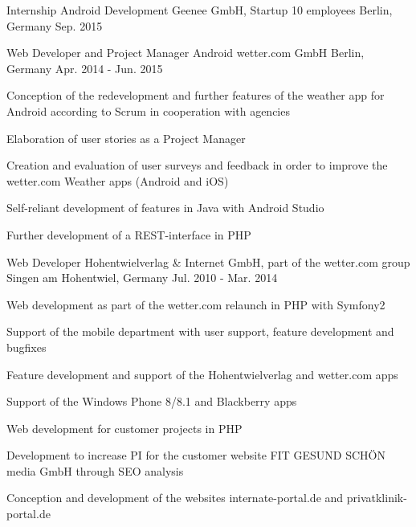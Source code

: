 \begin{cventries}
  \cventry
    {Internship Android Development} %
    {Geenee GmbH, Startup 10 employees} %
    {Berlin, Germany} %
    {Sep. 2015} %
    {}

  \cventry
    {Web Developer and Project Manager Android} %
    {wetter.com GmbH} %
    {Berlin, Germany} %
    {Apr. 2014 - Jun. 2015} %
    {
      \begin{cvitems} %
        \item {Conception of the redevelopment and further features of the weather app for Android according to Scrum in cooperation with agencies}
        \item {Elaboration of user stories as a Project Manager}
        \item {Creation and evaluation of user surveys and feedback in order to improve the wetter.com Weather apps (Android and iOS)}
        \item {Self-reliant development of features in Java with Android Studio}
        \item {Further development of a REST-interface in PHP}
      \end{cvitems}
    }

  \cventry
    {Web Developer} %
    {Hohentwielverlag \& Internet GmbH, part of the wetter.com group} %
    {Singen am Hohentwiel, Germany} %
    {Jul. 2010 - Mar. 2014} %
    {
      \begin{cvitems} %
        \item {Web development as part of the wetter.com relaunch in PHP with Symfony2}
        \item {Support of the mobile department with user support, feature development and bugfixes}
        \item {Feature development and support of the Hohentwielverlag and wetter.com apps}
        \item {Support of the Windows Phone 8/8.1 and Blackberry apps}
        \item {Web development for customer projects in PHP}
        \item {Development to increase PI for the customer website FIT GESUND SCHÖN media GmbH through SEO analysis}
        \item {Conception and development of the websites internate-portal.de and privatklinik-portal.de}
      \end{cvitems}
    }
    

\end{cventries}
